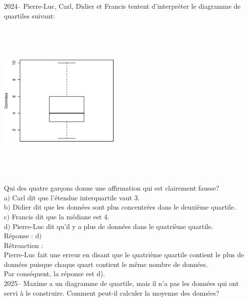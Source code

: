 \documentclass[letterpaper, 12pt]{article}
\begin{document}

2024-- Pierre-Luc, Carl, Didier et Francis tentent d'interpr\'eter le diagramme de quartiles suivant:
\begin{center}
 \includegraphics[width=6cm,height=8cm,angle=-90]{Q2024.eps}
\end{center}

Qui des quatre gar\c cons donne une affirmation qui est clairement fausse?\\

a$)$ Carl dit que l'\'etendue interquartile vaut 3. \\
b$)$ Didier dit que les donn\'ees sont plus concentr\'ees dans le deuxi\`eme quartile.\\
c$)$ Francis dit que la m\'ediane est 4.\\
d$)$ Pierre-Luc dit qu'il y a plus de donn\'ees dans le quatri\`eme quartile. \\

R\'eponse : d$)$\\

R\'etroaction :\\
Pierre-Luc fait une erreur en disant que le quatri\`eme quartile contient le plus de donn\'ees puisque chaque quart contient le m\^eme nombre de donn\'ees. \\
Par cons\'equent, la r\'eponse est d).\\

2025-- Maxime a un diagramme de quartile, mais il n'a pas les donn\'ees qui ont servi \`a le construire. Comment peut-il calculer la moyenne des donn\'ees?\\
\end{document}
